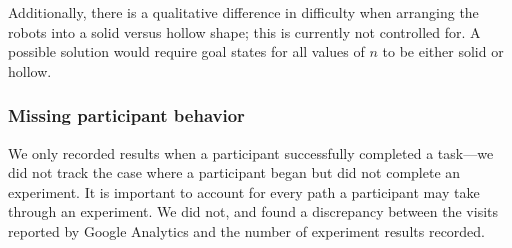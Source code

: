 Additionally, there is a qualitative difference in difficulty when arranging the robots into a solid versus hollow shape; this is currently not controlled for. A possible solution would require goal states for all values of $n$ to be either solid or hollow.

\subsubsection{Missing participant behavior}

We only recorded results when a participant successfully completed a task---we did not track the case where a participant began but did not complete an experiment. It is important to account for every path a participant may take through an experiment. We did not, and found a discrepancy between the visits reported by Google Analytics and the number of experiment results recorded.
